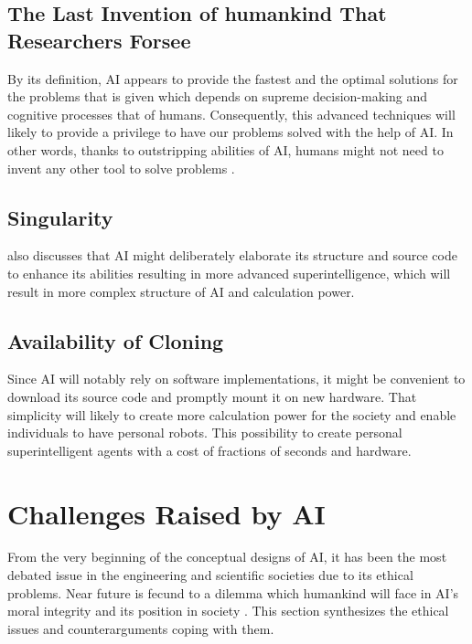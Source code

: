 \documentclass[man]{apa6}
\begin{document}
\subsection{The Last Invention of humankind That Researchers Forsee}
By its definition, AI appears to provide the fastest and the optimal solutions for the problems that is given which depends on supreme decision-making and cognitive processes that of humans. Consequently, this advanced techniques will likely to provide a privilege to have our problems solved with the help of AI. In other words, thanks to outstripping abilities of AI, humans might not need to invent any other tool to solve problems \cite{bost}.
\subsection{Singularity}
 also discusses that AI might deliberately elaborate its structure and source code to enhance its abilities resulting in more advanced superintelligence, which will result in more complex structure of AI and calculation power.
\subsection{Availability of Cloning}
Since AI will notably rely on software implementations, it might be convenient to download its source code and promptly mount it on new hardware. That simplicity will likely to create more calculation power for the society and enable individuals to have personal robots. This possibility to create personal superintelligent agents with a cost of fractions of seconds and hardware.
\section{Challenges Raised by AI}
From the very beginning of the conceptual designs of AI, it has been the most debated issue in the engineering and scientific societies due to its ethical problems. Near future is fecund to a dilemma which humankind will face in AI's moral integrity and its position in society \cite{duff}. This section synthesizes the ethical issues and counterarguments coping with them.
\end{document}
